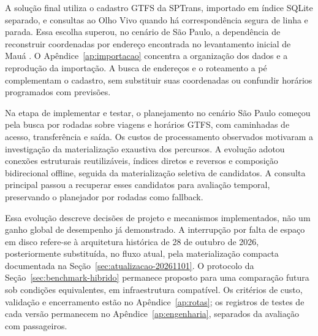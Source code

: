 \endgroup

\label{sec:conversao}
A solução final utiliza o cadastro GTFS da SPTrans, importado em índice SQLite separado, e consultas ao Olho Vivo quando há correspondência segura de linha e parada. Essa escolha superou, no cenário de São Paulo, a dependência de reconstruir coordenadas por endereço encontrada no levantamento inicial de Mauá \citep{mbmimportacoes}. O Apêndice~\ref{ap:importacao} concentra a organização dos dados e a reprodução da importação. A busca de endereços e o roteamento a pé complementam o cadastro, sem substituir suas coordenadas ou confundir horários programados com previsões.

\label{sec:implementar-testar}
Na etapa de implementar e testar, o planejamento no cenário São Paulo começou pela busca por rodadas sobre viagens e horários GTFS, com caminhadas de acesso, transferência e saída. Os custos de processamento observados motivaram a investigação da materialização exaustiva dos percursos. A evolução adotou conexões estruturais reutilizáveis, índices diretos e reversos e composição bidirecional offline, seguida da materialização seletiva de candidatos. A consulta principal passou a recuperar esses candidatos para avaliação temporal, preservando o planejador por rodadas como fallback.

\begin{samepage}
Essa evolução descreve decisões de projeto e mecanismos implementados, não um ganho global de desempenho já demonstrado. A interrupção por falta de espaço em disco refere-se à arquitetura histórica de 28 de outubro de 2026, posteriormente substituída, no fluxo atual, pela materialização compacta documentada na Seção~\ref{sec:atualizacao-20261101}. O protocolo da Seção~\ref{sec:benchmark-hibrido} permanece proposto para uma comparação futura sob condições equivalentes, em infraestrutura compatível. Os critérios de custo, validação e encerramento estão no Apêndice~\ref{ap:rotas}; os registros de testes de cada versão permanecem no Apêndice~\ref{ap:engenharia}, separados da avaliação com passageiros.
\par\end{samepage}

